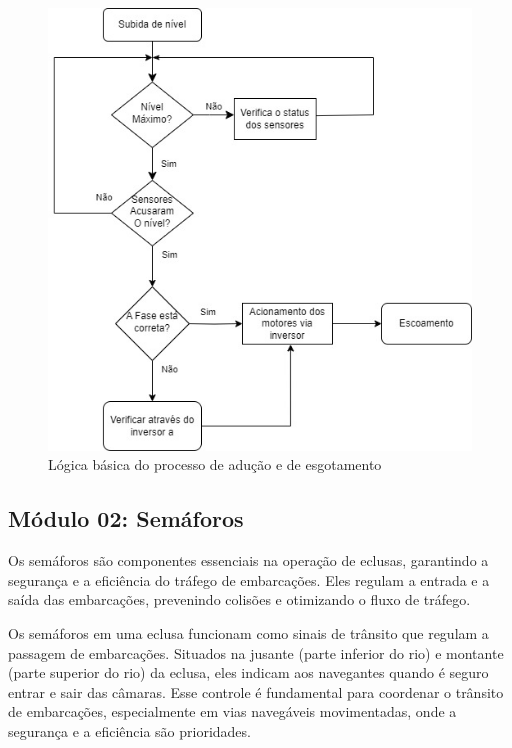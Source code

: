 \begin{figure}[h]
	\centering
	\label{fig:diag_pocos}
		\includegraphics[keepaspectratio=true,scale=0.6]{figuras/pocos_new.jpg}
	\caption{Lógica básica do processo de adução e de esgotamento}
\end{figure}



\subsection{Módulo 02: Semáforos}


Os semáforos são componentes essenciais na operação de eclusas, garantindo a segurança e a eficiência do tráfego de embarcações. Eles regulam a entrada e a saída das embarcações, prevenindo colisões e otimizando o fluxo de tráfego.

Os semáforos em uma eclusa funcionam como sinais de trânsito que regulam a passagem de embarcações. Situados na jusante (parte inferior do rio) e montante (parte superior do rio) da eclusa, eles indicam aos navegantes quando é seguro entrar e sair das câmaras. Esse controle é fundamental para coordenar o trânsito de embarcações, especialmente em vias navegáveis movimentadas, onde a segurança e a eficiência são prioridades.

